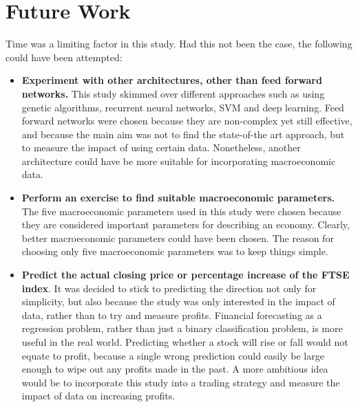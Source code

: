 \documentclass{UoYCSproject}
\begin{document}
\section{Future Work}
Time was a limiting factor in this study. Had this not been the case, the following could have been attempted:
\begin{itemize}
    \item \textbf{Experiment with other architectures, other than feed forward networks.} This study skimmed over different approaches such as using genetic algorithms, recurrent neural networks, SVM and deep learning. Feed forward networks were chosen because they are non-complex yet still effective, and because the main aim was not to find the state-of-the art approach, but to measure the impact of using certain data. Nonetheless, another architecture could have be more suitable for incorporating macroeconomic data. 
    \item \textbf{Perform an exercise to find suitable macroeconomic parameters.} The five macroeconomic parameters used in this study were chosen because they are considered important parameters for describing an economy. Clearly, better macroeconomic parameters could have been chosen. The reason for choosing only five macroeconomic parameters was to keep things simple. 
    \item \textbf{Predict the actual closing price or percentage increase of the FTSE index}. It was decided to stick to predicting the direction not only for simplicity, but also because the study was only interested in the impact of data, rather than to try and measure profits. Financial forecasting as a regression problem, rather than just a binary classification problem, is more useful in the real world. Predicting whether a stock will rise or fall would not equate to profit, because a single wrong prediction could easily be large enough to wipe out any profits made in the past. A more ambitious idea would be to incorporate this study into a trading strategy and measure the impact of data on increasing profits. 
\end{itemize}

\printbibliography
\end{document}
